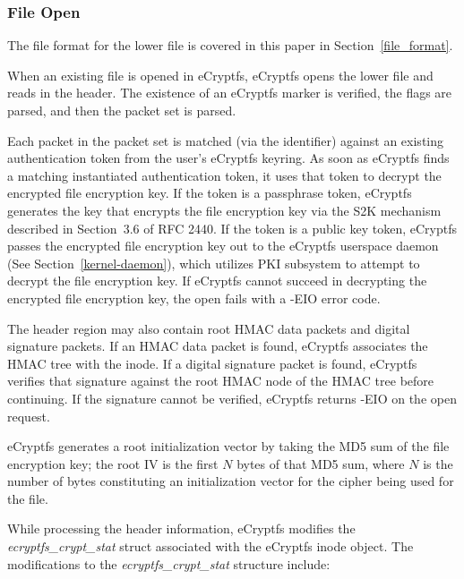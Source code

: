 \documentclass{article}
\begin{document}
\subsubsection{File Open}

The file format for the lower file is covered in this paper in
Section~\ref{file_format}.

When an existing file is opened
in eCryptfs, eCryptfs opens the lower file and reads in the header. 
The existence of an eCryptfs marker is verified, 
the flags are parsed, 
and then the packet set is parsed.

Each packet in the packet set is matched (via the identifier) against
an existing authentication token from the user's eCryptfs keyring. As
soon as eCryptfs finds a matching instantiated authentication token,
it uses that token to decrypt the encrypted file encryption key. If
the token is a passphrase token, eCryptfs generates the key that
encrypts the file encryption key via the S2K mechanism described in
Section~3.6 of RFC 2440\cite{rfc2440}. If the token is a public key
token, eCryptfs passes the encrypted file encryption key out to the
eCryptfs userspace daemon (See Section~\ref{kernel-daemon}), which
utilizes PKI subsystem to attempt to decrypt the file encryption
key. If eCryptfs cannot succeed in decrypting the encrypted file
encryption key, the open fails with a -EIO error code.

The header region may also contain root HMAC data packets and digital
signature packets. If an HMAC data packet is found, eCryptfs
associates the HMAC tree with the inode. If a digital signature packet
is found, eCryptfs verifies that signature against the root HMAC node
of the HMAC tree before continuing. If the signature cannot be
verified, eCryptfs returns -EIO on the open request.

eCryptfs generates a root initialization vector by taking the MD5 sum
of the file encryption key; the root IV is the first $N$ bytes of that
MD5 sum, where $N$ is the number of bytes constituting an
initialization vector for the cipher being used for the file.

While processing the header information, eCryptfs modifies the
\emph{ecryptfs\_crypt\_stat} struct associated with the eCryptfs inode
object.
The modifications to the \emph{ecryptfs\_crypt\_stat} structure
include:
\end{document}
